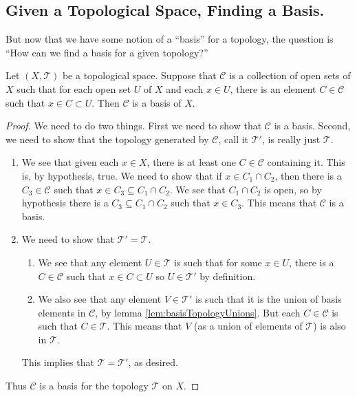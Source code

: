 \subsection{Given a Topological Space, Finding a Basis.}
\begin{prob}
But now that we have some notion of a ``basis'' for a topology,
the question is ``How can we find a basis for a given topology?''
\end{prob}
\begin{lem}\label{lem:findingTopologyBasis}
Let $(X,\mathcal{T})$ be a topological space. Suppose that $\mathscr{C}$ is a
collection of open sets of $X$ such that for each open set $U$ of
$X$ and each $x\in U$, there is an element $C\in\mathscr{C}$ such
that
$x\in C\subset U$. Then $\mathscr{C}$ is a basis of $X$.
\end{lem}
\begin{proof}
We need to do two things. First we need to show that
$\mathscr{C}$ is a basis. Second, we need to show that the
topology generated by $\mathscr{C}$, call it $\mathcal{T}'$, is
really just $\mathcal{T}$.
\begin{enumerate}
\item We see that given each $x\in X$, there is at least one
  $C\in\mathscr{C}$ containing it. This is, by hypothesis,
  true. We need to show that if $x\in C_{1}\cap C_{2}$, then
  there is a $C_{3}\in\mathscr{C}$ such that $x\in C_{3}\subseteq
  C_{1}\cap C_{2}$. We see that $C_{1}\cap C_{2}$ is open, so by
  hypothesis there is a $C_{3}\subseteq C_{1}\cap C_{2}$ such
  that $x\in C_{3}$. This means that $\mathscr{C}$ is a basis.
\item We need to show that $\mathcal{T}'=\mathcal{T}$.
\begin{enumerate}
\item We see that any element $U\in\mathcal{T}$ is such that for
  some $x\in U$, there is a $C\in\mathscr{C}$ such that $x\in
  C\subset U$ so $U\in\mathcal{T}'$ by definition. 
\item We also see that any element $V\in\mathcal{T}'$ is such
  that it is the union of basis elements in $\mathscr{C}$, by
  lemma \eqref{lem:basisTopologyUnions}. But each
  $C\in\mathscr{C}$ is such that $C\in\mathcal{T}$. This means
  that $V$ (as a union of elements of $\mathcal{T}$) is also in
  $\mathcal{T}$.
\end{enumerate}
This implies that $\mathcal{T}=\mathcal{T}'$, as desired.
\end{enumerate}
Thus $\mathscr{C}$ is a basis for the topology $\mathcal{T}$ on $X$.
\end{proof}
